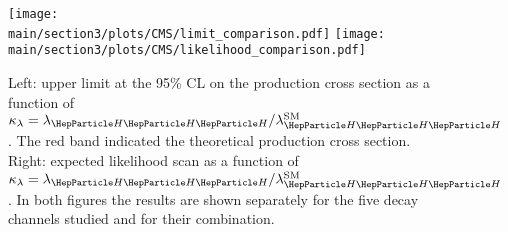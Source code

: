 \begin{figure}[htb]
  \centering
   \texttt{[image: \\main/section3/plots/CMS/limit\_comparison.pdf]}
    \texttt{[image: \\main/section3/plots/CMS/likelihood\_comparison.pdf]}
    \caption{Left: upper limit at the 95\% CL on the \HH production cross section as a function of $\kapl = \lambdahhh/\lambdahhh^\text{SM}$. The red band indicated the theoretical production cross section. Right: expected likelihood scan as a function of $\kappa_\lambda = \lambdahhh/\lambdahhh^\text{SM}$. In both figures the results are shown separately for the five decay channels studied and for their combination.}
    \label{sec3:CMSHH:fig:comb_plots}
\end{figure}
